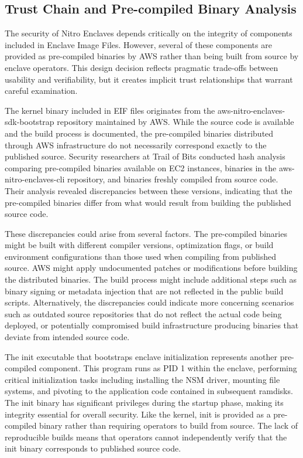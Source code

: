 \subsection{Trust Chain and Pre-compiled Binary Analysis}

The security of Nitro Enclaves depends critically on the integrity of components included in Enclave Image Files. However, several of these components are provided as pre-compiled binaries by AWS rather than being built from source by enclave operators. This design decision reflects pragmatic trade-offs between usability and verifiability, but it creates implicit trust relationships that warrant careful examination.

The kernel binary included in EIF files originates from the aws-nitro-enclaves-sdk-bootstrap repository maintained by AWS. While the source code is available and the build process is documented, the pre-compiled binaries distributed through AWS infrastructure do not necessarily correspond exactly to the published source. Security researchers at Trail of Bits conducted hash analysis comparing pre-compiled binaries available on EC2 instances, binaries in the aws-nitro-enclaves-cli repository, and binaries freshly compiled from source code. Their analysis revealed discrepancies between these versions, indicating that the pre-compiled binaries differ from what would result from building the published source code.

These discrepancies could arise from several factors. The pre-compiled binaries might be built with different compiler versions, optimization flags, or build environment configurations than those used when compiling from published source. AWS might apply undocumented patches or modifications before building the distributed binaries. The build process might include additional steps such as binary signing or metadata injection that are not reflected in the public build scripts. Alternatively, the discrepancies could indicate more concerning scenarios such as outdated source repositories that do not reflect the actual code being deployed, or potentially compromised build infrastructure producing binaries that deviate from intended source code.

The init executable that bootstraps enclave initialization represents another pre-compiled component. This program runs as PID 1 within the enclave, performing critical initialization tasks including installing the NSM driver, mounting file systems, and pivoting to the application code contained in subsequent ramdisks. The init binary has significant privileges during the startup phase, making its integrity essential for overall security. Like the kernel, init is provided as a pre-compiled binary rather than requiring operators to build from source. The lack of reproducible builds means that operators cannot independently verify that the init binary corresponds to published source code.

